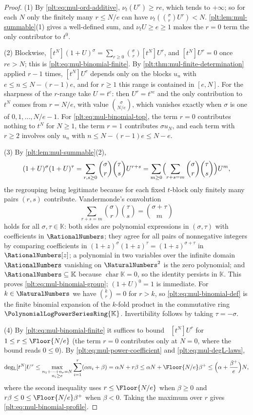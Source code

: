 \documentclass[11pt,oneside]{article}
\theoremstyle{plain}
\theoremstyle{definition}
\theoremstyle{remark}
\newcommand{\K}{\mathbb{K}}
\newcommand{\PLpow}{\PolynomialLogPowerSeriesRing{\K}}   %
\newcommand{\ordt}{\nu_{t}}                              %
\DeclareMathOperator{\degL}{deg_{L}}
\begin{document}
\begin{proof}
(1) By \eqref{plt:eq:mul-ord-additive}, $\ordt(U^r)\ge re$, which tends to
$+\infty$; so for each $N$ only the finitely many $r\le N/e$ can have
$\ordt(\binom{\sigma}{r}U^r)<N$.  \cref{plt:lem:mul-summable}(1) gives a
well-defined sum, and $\ordt U\ge e\ge1$ makes the $r=0$ term the only
contributor to $t^0$.

(2) Blockwise, $[t^N](1+U)^\sigma=\sum_{r\ge0}\binom{\sigma}{r}[t^N]U^r$, and
$[t^N]U^r=0$ once $re>N$; this is \eqref{plt:eq:mul-binomial-finite}.  By
\cref{plt:thm:mul-finite-determination} applied $r-1$ times, $[t^N]U^r$
depends only on the blocks $u_n$ with $e\le n\le N-(r-1)e$, and for $r\ge1$
this range is contained in $[e,N]$.  For the sharpness of the $r$-range take
$U=t^e$: then $U^r=t^{re}$ and the only contribution to $t^N$ comes from
$r=N/e$, with value $\binom{\sigma}{N/e}$, which vanishes exactly when
$\sigma$ is one of $0,1,\ldots,N/e-1$.  For
\eqref{plt:eq:mul-binomial-top}, the term $r=0$ contributes nothing to
$t^N$ for $N\ge1$, the term $r=1$ contributes $\sigma u_N$, and each term
with $r\ge2$ involves only $u_n$ with $n\le N-(r-1)e\le N-e$.

(3) By \cref{plt:lem:mul-summable}(2),
\[
 (1+U)^\sigma(1+U)^\tau
 =\sum_{r,s\ge0}\binom{\sigma}{r}\binom{\tau}{s}U^{r+s}
 =\sum_{m\ge0}\Bigl(\sum_{r+s=m}\binom{\sigma}{r}\binom{\tau}{s}\Bigr)U^m,
\]
the regrouping being legitimate because for each fixed $t$-block only
finitely many pairs $(r,s)$ contribute.  Vandermonde's convolution
\cite{graham-knuth-patashnik}
\[
 \sum_{r+s=m}\binom{\sigma}{r}\binom{\tau}{s}=\binom{\sigma+\tau}{m}
\]
holds for all $\sigma,\tau\in\K$: both sides are polynomial expressions in
$(\sigma,\tau)$ with coefficients in $\RationalNumbers$; they agree for all
pairs of nonnegative integers by comparing coefficients in
$(1+z)^{\sigma}(1+z)^{\tau}=(1+z)^{\sigma+\tau}$ in
$\RationalNumbers[z]$; a polynomial in two variables over the infinite domain
$\RationalNumbers$ vanishing on $\NaturalNumbers^2$ is the zero polynomial;
and $\RationalNumbers\subseteq\K$ because $\operatorname{char}\K=0$, so the
identity persists in $\K$.  This proves
\eqref{plt:eq:mul-binomial-group}; $(1+U)^0=1$ is immediate.  For
$k\in\NaturalNumbers$ we have $\binom{k}{r}=0$ for $r>k$, so
\eqref{plt:eq:mul-binomial-def} is the finite binomial expansion of the
$k$-fold product in the commutative ring $\PLpow$.  Invertibility follows by
taking $\tau=-\sigma$.

(4) By \eqref{plt:eq:mul-binomial-finite} it suffices to bound
$\degL[t^N]U^r$ for $1\le r\le\Floor{N/e}$ (the term $r=0$ contributes only
at $N=0$, where the bound reads $0\le0$).  By
\eqref{plt:eq:mul-power-coefficient} and \eqref{plt:eq:mul-degL-laws},
\[
 \degL[t^N]U^r
 \le\max_{\substack{n_1+\cdots+n_r=N\\ n_i\ge e}}
    \sum_{i=1}^{r}(\alpha n_i+\beta)
 =\alpha N+r\beta
 \le\alpha N+\Floor{N/e}\beta^+
 \le\Bigl(\alpha+\frac{\beta^+}{e}\Bigr)N,
\]
where the second inequality uses $r\le\Floor{N/e}$ when $\beta\ge0$ and
$r\beta\le0\le\Floor{N/e}\beta^+$ when $\beta<0$.  Taking the maximum over
$r$ gives \eqref{plt:eq:mul-binomial-profile}.
\end{proof}
\end{document}
